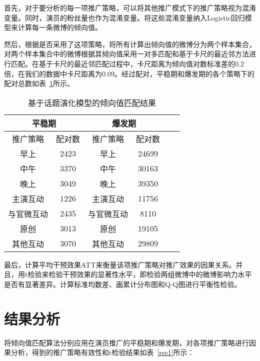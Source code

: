 首先，对于要分析的每一项推广策略，可以将其他推广模式下的推广策略视为混淆变量。同时，演员的粉丝量也作为混淆变量。将这些混淆变量纳入Logistic回归模型来计算每一条微博的倾向值。

然后，根据是否采用了这项策略，将所有计算出倾向值的微博分为两个样本集合，对两个样本集合中的微博根据其倾向值采用一对多匹配和基于卡尺的最近邻方法进行匹配。在基于卡尺的最近邻匹配过程中，卡尺距离为倾向值对数标准差的$0.2$倍，在我们的数据中卡尺距离为0.09。经过配对，平稳期和爆发期的各个策略下的配对总数如表~\ref{pair}所示。

\begin{table}[!htbp]
\centering
\caption{基于话题演化模型的倾向值匹配结果}
\label{pair}
\begin{tabular}{|c|c|c|c|c|c|} \hline
\multicolumn{2}{|c|}{平稳期}& \multicolumn{2}{c|}{爆发期}\\ \hline
推广策略 & 配对数& 推广策略 & 配对数\\ \hline
早上 & 2423& 早上 & 24699\\%
中午 & 3370 & 中午 & 30163\\%
晚上 & 3049 & 晚上 & 39350\\ \hline
主演互动 & 1226 &  主演互动 & 11756\\
与官微互动& 2435 & 与官微互动 & 8110\\%
原创& 3013 & 原创& 19105\\
其他互动& 3070 & 其他互动 & 29809\\ \hline
\end{tabular}
\end{table}

最后，计算平均干预效果ATT来衡量该项推广策略对推广效果的因果关系。并且，用t检验来检验干预效果的显著性水平，即检验两组微博中的微博影响力水平是否有显著差异。计算标准均数差、画累计分布图和Q-Q图进行平衡性检验。

\section{结果分析}

将倾向值匹配算法分别应用在演员推广的平稳期和爆发期，对各项推广策略进行因果分析，得到的推广策略有效性和t检验结果如表~\ref{res1}所示：

